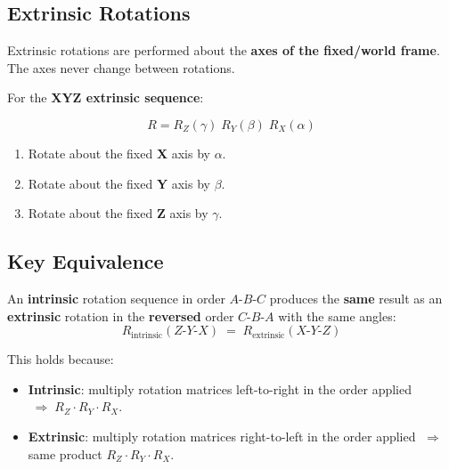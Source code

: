 \documentclass[12pt,a4paper]{article}
\begin{document}
\subsection{Extrinsic Rotations}

Extrinsic rotations are performed about the \textbf{axes of the fixed/world
frame}. The axes never change between rotations.

For the \textbf{XYZ extrinsic sequence}:

\begin{equation}
  R = R_Z(\gamma)\; R_Y(\beta)\; R_X(\alpha)
\end{equation}

\begin{enumerate}
  \item Rotate about the fixed \textbf{X} axis by $\alpha$.
  \item Rotate about the fixed \textbf{Y} axis by $\beta$.
  \item Rotate about the fixed \textbf{Z} axis by $\gamma$.
\end{enumerate}

\subsection{Key Equivalence}

\begin{keybox}
An \textbf{intrinsic} rotation sequence in order $A$-$B$-$C$ produces the
\textbf{same} result as an \textbf{extrinsic} rotation in the
\textbf{reversed} order $C$-$B$-$A$ with the same angles:
%
\begin{equation}
  R_{\text{intrinsic}}(Z\text{-}Y\text{-}X)
  \;=\; R_{\text{extrinsic}}(X\text{-}Y\text{-}Z)
\end{equation}
\end{keybox}

This holds because:
\begin{itemize}
  \item \textbf{Intrinsic}: multiply rotation matrices left-to-right in the
        order applied $\;\Rightarrow\; R_Z \cdot R_Y \cdot R_X$.
  \item \textbf{Extrinsic}: multiply rotation matrices right-to-left in the
        order applied $\;\Rightarrow\;$ same product $R_Z \cdot R_Y \cdot R_X$.
\end{itemize}
\end{document}
